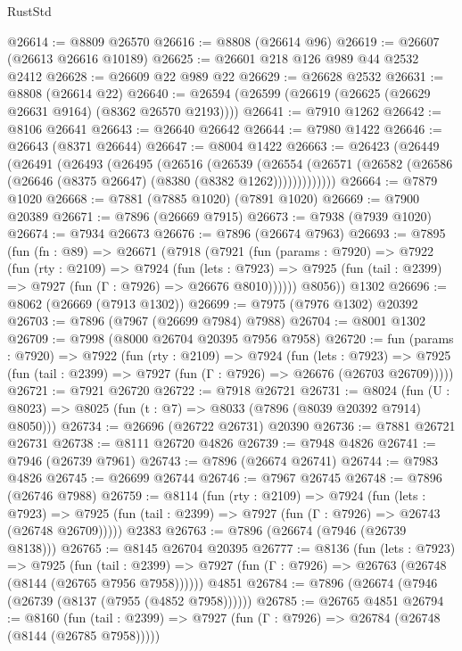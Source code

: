 \begin{lexlean}{RustStd}
\begin{coremodule}
@26614 := @8809 @26570
@26616 := @8808 (@26614 @96)
@26619 := @26607 (@26613 @26616 @10189)
@26625 := @26601 @218 @126 @989 @44 @2532 @2412
@26628 := @26609 @22 @989 @22
@26629 := @26628 @2532
@26631 := @8808 (@26614 @22)
@26640 := @26594 (@26599 (@26619 (@26625 (@26629 @26631 @9164) (@8362 @26570 @2193))))
@26641 := @7910 @1262
@26642 := @8106 @26641
@26643 := @26640 @26642
@26644 := @7980 @1422
@26646 := @26643 (@8371 @26644)
@26647 := @8004 @1422
@26663 := @26423
    (@26449
      (@26491
        (@26493
          (@26495
            (@26516
              (@26539
                (@26554
                  (@26571 (@26582 (@26586 (@26646 (@8375 @26647) (@8380 (@8382 @1262)))))))))))))
@26664 := @7879 @1020
@26668 := @7881 (@7885 @1020) (@7891 @1020)
@26669 := @7900 @20389
@26671 := @7896 (@26669 @7915)
@26673 := @7938 (@7939 @1020)
@26674 := @7934 @26673
@26676 := @7896 (@26674 @7963)
@26693 := @7895
    (fun (fn : @89) =>
    @26671
      (@7918
        (@7921
          (fun (params : @7920) =>
          @7922
            (fun (rty : @2109) =>
            @7924
              (fun (lets : @7923) =>
              @7925 (fun (tail : @2399) => @7927 (fun (Γ : @7926) => @26676 @8010))))))
        @8056))
    @1302
@26696 := @8062 (@26669 (@7913 @1302))
@26699 := @7975 (@7976 @1302) @20392
@26703 := @7896 (@7967 (@26699 @7984) @7988)
@26704 := @8001 @1302
@26709 := @7998 (@8000 @26704 @20395 @7956 @7958)
@26720 := fun (params : @7920) =>
  @7922
    (fun (rty : @2109) =>
    @7924
      (fun (lets : @7923) =>
      @7925 (fun (tail : @2399) => @7927 (fun (Γ : @7926) => @26676 (@26703 @26709)))))
@26721 := @7921 @26720
@26722 := @7918 @26721
@26731 := @8024
    (fun (U : @8023) => @8025 (fun (t : @7) => @8033 (@7896 (@8039 @20392 @7914) @8050)))
@26734 := @26696 (@26722 @26731) @20390
@26736 := @7881 @26721 @26731
@26738 := @8111 @26720 @4826
@26739 := @7948 @4826
@26741 := @7946 (@26739 @7961)
@26743 := @7896 (@26674 @26741)
@26744 := @7983 @4826
@26745 := @26699 @26744
@26746 := @7967 @26745
@26748 := @7896 (@26746 @7988)
@26759 := @8114
    (fun (rty : @2109) =>
    @7924
      (fun (lets : @7923) =>
      @7925 (fun (tail : @2399) => @7927 (fun (Γ : @7926) => @26743 (@26748 @26709)))))
    @2383
@26763 := @7896 (@26674 (@7946 (@26739 @8138)))
@26765 := @8145 @26704 @20395
@26777 := @8136
    (fun (lets : @7923) =>
    @7925
      (fun (tail : @2399) =>
      @7927 (fun (Γ : @7926) => @26763 (@26748 (@8144 (@26765 @7956 @7958))))))
    @4851
@26784 := @7896 (@26674 (@7946 (@26739 (@8137 (@7955 (@4852 @7958))))))
@26785 := @26765 @4851
@26794 := @8160
    (fun (tail : @2399) => @7927 (fun (Γ : @7926) => @26784 (@26748 (@8144 (@26785 @7958)))))

\end{coremodule}
\end{lexlean}

